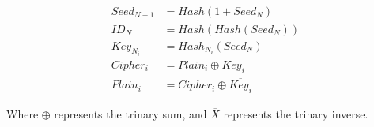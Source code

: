 \documentclass[]{slides}
\begin{document}
\begin{align}
Seed_{N+1} &= Hash ( 1 + Seed_N) \\
ID_N &= Hash(Hash(Seed_N) ) \\
Key_{N_i} &= Hash_{N_i}(Seed_N) \\
Cipher_i &= Plain_i \oplus Key_i \\
Plain_i &= Cipher_i \oplus \overline{Key_i}
\end{align}

Where $\oplus$ represents the trinary sum, and $\overline{X}$ represents the trinary inverse.
\end{document}
